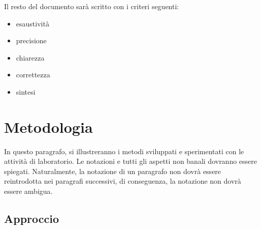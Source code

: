 \documentclass{llncs}
\begin{document}
Il resto del documento sar\`a scritto con i criteri seguenti:
\begin{itemize}
\item esaustivit\`a
\item precisione
\item chiarezza
\item correttezza
\item sintesi
\end{itemize}

\section{Metodologia}
\label{sec:metodologia}

In questo paragrafo, si illustreranno i metodi sviluppati e sperimentati con le
attivit\`a di laboratorio. Le notazioni e tutti gli aspetti non banali dovranno
essere spiegati. Naturalmente, la notazione di un paragrafo non dovr\`a essere
reintrodotta nei paragrafi successivi, di conseguenza, la notazione non dovr\`a
essere ambigua.

\subsection{Approccio}
\label{sec:approccio}
\end{document}
